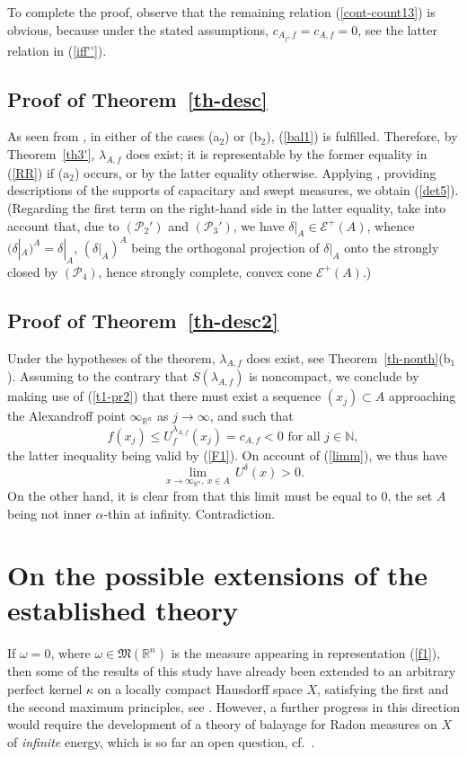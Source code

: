 \documentclass[12pt,a4paper,reqno]{amsart} %
\theoremstyle{lause}
\theoremstyle{maaritelma}
\theoremstyle{lause}
\theoremstyle{maaritelma}
\numberwithin{equation}{section}
\begin{document}
To complete the proof, observe that the remaining relation (\ref{cont-count13}) is obvious, because under the stated assumptions, $c_{A_j,f}=c_{A,f}=0$, see the latter relation in (\ref{iff''}).

\subsection{Proof of Theorem~\ref{th-desc}}\label{123}As seen from \cite[Corollary~5.3]{Z-bal2}, in either of the cases (a$_2$) or (b$_2$), (\ref{bal1}) is fulfilled. Therefore, by Theorem~\ref{th3'}, $\lambda_{A,f}$ does exist; it is representable by the former equality in (\ref{RR}) if (a$_2$) occurs, or by the latter  equality otherwise. Applying \cite[Theorems~7.2, 8.5]{Z-bal}, providing  descriptions of the supports of capacitary and swept measures, we obtain (\ref{det5}).
(Regarding the first term on the right-hand side in the latter equality, take into account that, due to $(\mathcal P_2')$ and $(\mathcal P_3')$, we have $\delta|_A\in\mathcal E^+(A)$, whence $(\delta|_A)^A=\delta|_A$, $(\delta|_A)^A$ being the orthogonal projection of $\delta|_A$ onto the strongly closed by $(\mathcal P_4)$, hence strongly complete, convex cone $\mathcal E^+(A)$.)

\subsection{Proof of Theorem~\ref{th-desc2}}\label{sec-pr9} Under the hypotheses of the theorem, $\lambda_{A,f}$ does exist, see Theorem~\ref{th-nonth}(b$_1$). Assuming to the contrary that $S(\lambda_{A,f})$ is noncompact, we conclude by making use of (\ref{t1-pr2})
that there must exist a sequence $(x_j)\subset A$ approaching the Alexandroff point $\infty_{\mathbb R^n}$ as $j\to\infty$, and such that
\[f(x_j)\leqslant U_f^{\lambda_{A,f}}(x_j)=c_{A,f}<0\text{ \ for all $j\in\mathbb N$},\]
the latter inequality being valid by (\ref{F1}). On account of (\ref{limm}), we thus have
\[\lim_{x\to\infty_{\mathbb R^n}, \ x\in A}\,U^\delta(x)>0.\]
On the other hand, it is clear from \cite[Theorem~2.1(ii)]{Z-bal2} that this limit must be equal to $0$, the set $A$ being not inner $\alpha$-thin at infinity. Contradiction.

\section{On the possible extensions of the established theory} If $\omega=0$, where $\omega\in\mathfrak M(\mathbb R^n)$ is the measure appearing in representation (\ref{f1}), then some of the results of this study have already been extended to an arbitrary perfect kernel $\kappa$ on a locally compact Hausdorff space $X$, satisfying the first and the second maximum principles, see \cite[Theorems~1.2, 1.5]{Z-Oh}. However, a further progress in this direction would require the development of a theory of balayage for Radon measures on $X$ of {\it infinite} energy, which is so far an open question, cf.\ \cite[Problem~7.1]{Z-arx}.
\end{document}
